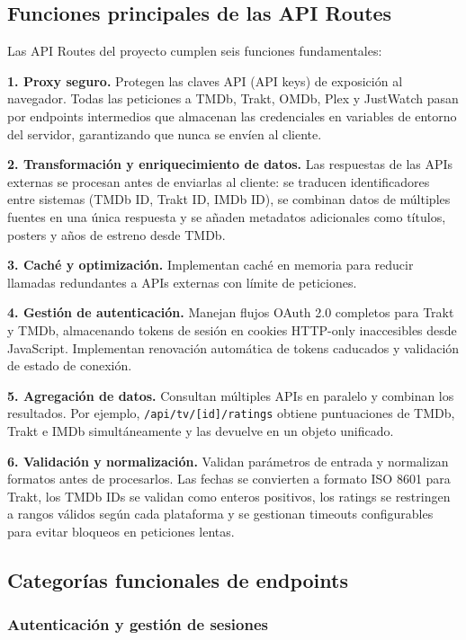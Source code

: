 \subsection{Funciones principales de las API Routes}

Las API Routes del proyecto cumplen seis funciones fundamentales:

\textbf{1. Proxy seguro.} Protegen las claves API (API keys) de exposición al navegador. Todas las peticiones a TMDb, Trakt, OMDb, Plex y JustWatch pasan por endpoints intermedios que almacenan las credenciales en variables de entorno del servidor, garantizando que nunca se envíen al cliente.

\textbf{2. Transformación y enriquecimiento de datos.} Las respuestas de las APIs externas se procesan antes de enviarlas al cliente: se traducen identificadores entre sistemas (TMDb ID, Trakt ID, IMDb ID), se combinan datos de múltiples fuentes en una única respuesta y se añaden metadatos adicionales como títulos, posters y años de estreno desde TMDb.

\textbf{3. Caché y optimización.} Implementan caché en memoria para reducir llamadas redundantes a APIs externas con límite de peticiones.

\textbf{4. Gestión de autenticación.} Manejan flujos OAuth 2.0 completos para Trakt y TMDb, almacenando tokens de sesión en cookies HTTP-only inaccesibles desde JavaScript. Implementan renovación automática de tokens caducados y validación de estado de conexión.

\textbf{5. Agregación de datos.} Consultan múltiples APIs en paralelo y combinan los resultados. Por ejemplo, \texttt{/api/tv/[id]/ratings} obtiene puntuaciones de TMDb, Trakt e IMDb simultáneamente y las devuelve en un objeto unificado.

\textbf{6. Validación y normalización.} Validan parámetros de entrada y normalizan formatos antes de procesarlos. Las fechas se convierten a formato ISO 8601 para Trakt, los TMDb IDs se validan como enteros positivos, los ratings se restringen a rangos válidos según cada plataforma y se gestionan timeouts configurables para evitar bloqueos en peticiones lentas.

\subsection{Categorías funcionales de endpoints}

\subsubsection{Autenticación y gestión de sesiones}


